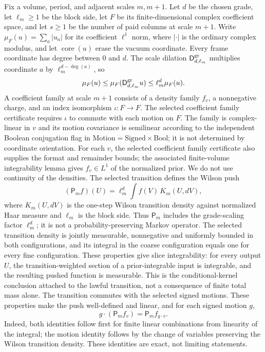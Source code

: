 Fix a volume, period, and adjacent scales $m,m+1$. Let $d$ be the chosen grade, let $\ell_m\geq1$ be the block side, let $F$ be its finite-dimensional complex coefficient space, and let $s\geq1$ be the number of paid columns at scale $m+1$. Write $\mu_F(u)=\sum_a|u_a|$ for its coefficient $\ell^1$ norm, where $|\cdot|$ is the ordinary complex modulus, and let $\operatorname{core}(u)$ erase the vacuum coordinate. Every frame coordinate has degree between $0$ and $d$. The scale dilation $\mathsf D^{\rm gr}_{d,\ell_m}$ multiplies coordinate $a$ by $\ell_m^{d-\deg(a)}$, so
\[
 \mu_F(u)\leq\mu_F(\mathsf D^{\rm gr}_{d,\ell_m} u)\leq\ell_m^d\mu_F(u).
\]
A coefficient family at scale $m+1$ consists of a density family $f_v$, a nonnegative charge, and an index isomorphism $\iota:F\to F$. The selected coefficient family certificate requires $\iota$ to commute with each motion on $F$. The family is complex-linear in $v$ and its motion covariance is semilinear according to the independent Boolean conjugation flag in $\mathrm{Motion}=\mathrm{Signed}\times\mathrm{Bool}$; it is not determined by coordinate orientation. For each $v$, the selected coefficient family certificate also supplies the format and remainder bounds; the associated finite-volume integrability lemma gives $f_v\in L^1$ of the normalized prior. We do not use continuity of the densities. The selected transition defines the Wilson push
\[
  (\mathsf P_m f)(U)=\ell_m^d\int f(V)\,K_m(U,dV),
\]
where $K_m(U,dV)$ is the one-step Wilson transition density against normalized Haar measure and $\ell_m$ is the block side. Thus $\mathsf P_m$ includes the grade-scaling factor $\ell_m^d$; it is not a probability-preserving Markov operator. The selected transition density is jointly measurable, nonnegative and uniformly bounded in both configurations, and its integral in the coarse configuration equals one for every fine configuration. These properties give slice integrability: for every output $U$, the transition-weighted section of a prior-integrable input is integrable, and the resulting pushed function is measurable. This is the conditional-kernel conclusion attached to the lawful transition, not a consequence of finite total mass alone. The transition commutes with the selected signed motions. These properties make the push well-defined and linear, and for each signed motion $g$,
\[
  g\cdot(\mathsf P_m f_v)=\mathsf P_m f_{g\cdot v}.
\]
Indeed, both identities follow first for finite linear combinations from linearity of the integral; the motion identity follows by the change of variables preserving the Wilson transition density. These identities are exact, not limiting statements.

